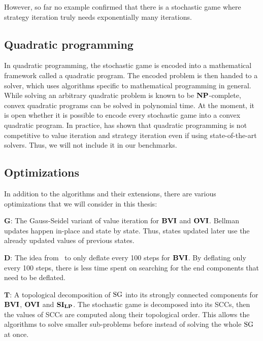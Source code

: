 However, so far no example confirmed that there is a stochastic game where strategy iteration truly needs exponentially many iterations.

\subsection{Quadratic programming}
In quadratic programming, the stochastic game is encoded into a mathematical framework called a quadratic program. 
The encoded problem is then handed to a solver, which uses algorithms specific to mathematical programming in general.
While solving an arbitrary quadratic problem is known to be $\mathbf{NP}$-complete, convex quadratic programs can be solved in polynomial time.
At the moment, it is open whether it is possible to encode every stochastic game into a convex quadratic program.
In practice, \cite{gandalf} has shown that quadratic programming is not competitive to value iteration and strategy iteration even if using 
state-of-the-art solvers. Thus, we will not include it in our benchmarks.

\subsection{Optimizations} \label{subsec:optimizations}
In addition to the algorithms and their extensions, there are various optimizations that we will consider in this thesis:

$\mathbf{G}$: The Gauss-Seidel variant of value iteration for $\mathbf{BVI}$ and $\mathbf{OVI}$. 
Bellman updates happen in-place and state by state. Thus, states updated later use the already updated values of previous states. 

$\mathbf{D}$: The idea from~\cite{paperMaxi} to only deflate every 100 steps for $\mathbf{BVI}$. 
By deflating only every 100 steps, there is less time spent on searching for the end components that need to be deflated.

$\mathbf{T}$: A topological decomposition of $\textrm{SG}$ into its strongly connected components for $\mathbf{BVI}$, $\mathbf{OVI}$ and $\mathbf{SI_{LP}}$.
The stochastic game is decomposed into its SCCs, then the values of SCCs are computed along their topological order.
This allows the algorithms to solve smaller sub-problems before instead of solving the whole $\textrm{SG}$ at once.

